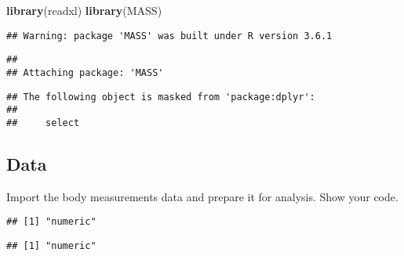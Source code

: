 \documentclass[]{article}
\newenvironment{Shaded}{\begin{snugshade}}{\end{snugshade}}
\newcommand{\CommentTok}[1]{\textcolor[rgb]{0.56,0.35,0.01}{\textit{#1}}}
\newcommand{\DataTypeTok}[1]{\textcolor[rgb]{0.13,0.29,0.53}{#1}}
\newcommand{\KeywordTok}[1]{\textcolor[rgb]{0.13,0.29,0.53}{\textbf{#1}}}
\newcommand{\NormalTok}[1]{#1}
\newcommand{\OperatorTok}[1]{\textcolor[rgb]{0.81,0.36,0.00}{\textbf{#1}}}
\newcommand{\StringTok}[1]{\textcolor[rgb]{0.31,0.60,0.02}{#1}}
\begin{document}
\begin{Shaded}
\begin{Highlighting}[]
\KeywordTok{library}\NormalTok{(readxl)}
\KeywordTok{library}\NormalTok{(MASS)}
\end{Highlighting}
\end{Shaded}

\begin{verbatim}
## Warning: package 'MASS' was built under R version 3.6.1
\end{verbatim}

\begin{verbatim}
## 
## Attaching package: 'MASS'
\end{verbatim}

\begin{verbatim}
## The following object is masked from 'package:dplyr':
## 
##     select
\end{verbatim}

\hypertarget{data}{%
\subsection{Data}\label{data}}

Import the body measurements data and prepare it for analysis. Show your
code.

\begin{Shaded}
\end{Shaded}

\begin{verbatim}
## [1] "numeric"
\end{verbatim}

\begin{Shaded}
\end{Shaded}

\begin{verbatim}
## [1] "numeric"
\end{verbatim}

\begin{Shaded}
\end{Shaded}
\end{document}
